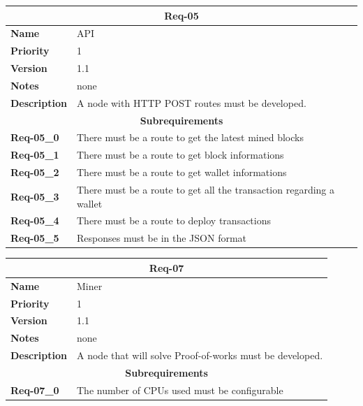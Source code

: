 \documentclass[../documentation.tex]{subfiles}
\begin{document}
\bgroup{}
\def\arraystretch{1.25}
\begin{center}
    \begin{tabular}{ |l|p{9cm}| }
        \hline
        \multicolumn{2}{|c|}{\textbf{Req-05}} \\
        \hline
        \textbf{Name} & API \\
        \hline
        \textbf{Priority} & 1 \\
        \hline
        \textbf{Version} & 1.1 \\
        \hline
        \textbf{Notes} & none \\
        \hline
        \textbf{Description} & A node with HTTP POST routes must be developed. \\
        \hline
        \multicolumn{2}{|c|}{\textbf{Subrequirements}} \\
        \hline
        \textbf{Req-05\_0} & There must be a route to get the latest mined blocks \\
        \hline
        \textbf{Req-05\_1} & There must be a route to get block informations \\
        \hline
        \textbf{Req-05\_2} & There must be a route to get wallet informations \\
        \hline
        \textbf{Req-05\_3} & There must be a route to get all the transaction regarding a wallet \\
        \hline
        \textbf{Req-05\_4} & There must be a route to deploy transactions \\
        \hline
        \textbf{Req-05\_5} & Responses must be in the JSON format \\
        \hline
    \end{tabular}
\end{center}
\egroup{}

\bgroup{}
\def\arraystretch{1.25}
\begin{center}
    \begin{tabular}{ |l|p{9cm}| }
        \hline
        \multicolumn{2}{|c|}{\textbf{Req-07}} \\
        \hline
        \textbf{Name} & Miner \\
        \hline
        \textbf{Priority} & 1 \\
        \hline
        \textbf{Version} & 1.1 \\
        \hline
        \textbf{Notes} & none \\
        \hline
        \textbf{Description} & A node that will solve Proof-of-works must be developed. \\
        \hline
        \multicolumn{2}{|c|}{\textbf{Subrequirements}} \\
        \hline
        \textbf{Req-07\_0} & The number of CPUs used must be configurable \\
        \hline
    \end{tabular}
\end{center}
\egroup{}
\end{document}
